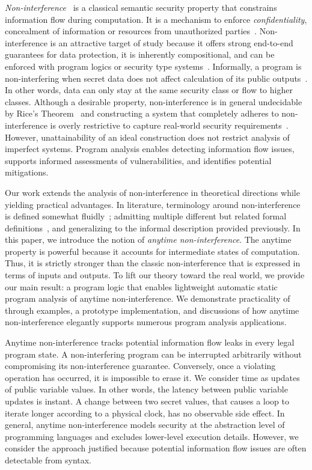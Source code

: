 \emph{Non-interference}~\cite{goguen1982} is a classical semantic security
property that constrains information flow during computation. It is a mechanism
to enforce \emph{confidentiality}, \ie concealment of information or resources
from unauthorized parties~\cite{bishop2003}. Non-interference is an attractive
target of study because it offers strong end-to-end guarantees for data
protection, it is inherently compositional, and can be enforced with program
logics or security type systems~\cite{cecchetti2017,frumin2021}. Informally, a
program is non-interfering when secret data does not affect calculation of its
public outputs~\cite{sabelfeld2003}. In other words, data can only stay at the
same security class or flow to higher classes. Although a desirable property,
non-interference is in general undecidable by Rice's Theorem~\cite{rice1953} and
constructing a system that completely adheres to non-interference is overly
restrictive to capture real-world security
requirements~\cite{bossi2005,cecchetti2017}. However, unattainability of an
ideal construction does not restrict analysis of imperfect systems. Program
analysis enables detecting information flow issues, supports informed
assessments of vulnerabilities, and identifies potential mitigations.

Our work extends the analysis of non-interference in theoretical directions
while yielding practical advantages. In literature, terminology around
non-interference is defined somewhat fluidly~\cite{sabelfeld2003}; admitting
multiple different but related {formal definitions}~\cite{nelson2020}, and
generalizing to the informal description provided previously. In this paper, we
introduce the notion of \emph{anytime non-interference}. The anytime property is
powerful because it accounts for intermediate states of computation. Thus, it is
strictly stronger than the classic non-interference that is expressed in terms
of inputs and outputs. To lift our theory toward the real world, we provide our
main result: a program logic \lname that enables lightweight automatic static
program analysis of anytime non-interference. We demonstrate practicality of
\lname through examples, a prototype implementation, and discussions of how
anytime non-interference elegantly supports numerous program analysis
applications.

Anytime non-interference tracks potential information flow leaks in every legal
program state. A non-interfering program can be interrupted arbitrarily without
compromising its non-interference guarantee. Conversely, once a violating
operation has occurred, it is impossible to erase it. We consider time as
updates of public variable values. In other words, the latency between public
variable updates is instant. A change between two secret values, that causes a
loop to iterate longer according to a physical clock, has no observable side
effect. In general, anytime non-interference models security at the abstraction
level of programming languages and excludes lower-level execution details.
However, we consider the approach justified because potential information flow
issues are often detectable from syntax.
 
